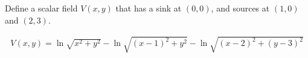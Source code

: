 Define a scalar field $V(x,y)$ that has a sink at $(0, 0)$, and sources at $(1, 0)$ and $(2, 3)$.

\begin{solution}
\begin{align*}
    V(x, y) = \ln{\sqrt{x^2+y^2}} - \ln{\sqrt{(x-1)^2+y^2}} - \ln{\sqrt{(x-2)^2+(y-3)^2}}
\end{align*}
\end{solution}